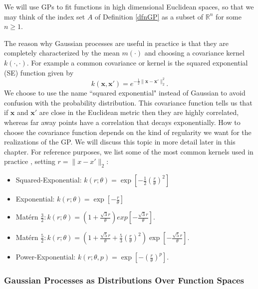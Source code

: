 \documentclass{sfuthesis}
\newcommand{\x}{\textbf{x}}
\begin{document}
 

We will use GPs to fit  functions in  high dimensional Euclidean spaces, so 
that we may think
of the  index set $A$ of Definition \ref{dfnGP} as a subset of $\mathbb{R}^{n}$ for some $n\geq 1$. 
\newline

The reason why  Gaussian processes are useful in practice is that  they are 
completely characterized by the mean $m(\cdot)$ and choosing a covariance kernel $k(\cdot,\cdot)$\cite{lifshits2012lectures}. 
 For example a  common covariance or kernel is the
 squared exponential (SE) function given by  
\begin{equation}\label{eqnsquareexponential}
k(\x,\x')=e^{-\frac{1}{2}\|\x-\x'\|_{2}^{2}}.
\end{equation}
We choose to use the name ``squared exponential" instead of 
Gaussian to avoid confusion with
the probability distribution.
This  covariance function tells us that if $\x$ and $\x'$ are close in the Euclidean metric 
then they are highly correlated, whereas far away points have a correlation that decays exponentially.
How to choose the covariance function depends on the kind
of regularity we want for the realizations of the GP. We will discuss this topic in
more detail later in this chapter. For reference purposes, we list 
some of the most common kernels used in practice \cite{rasmussen2006gaussian}, setting $r=\|x-x'\|_{2}$:

\begin{itemize}
\item Squared-Exponential: $k(r;\theta)=\exp\left[-\frac{1}{2}(\frac{r}{\theta})^{2}\right]$
\item Exponential: $k(r;\theta)=\exp\left[-\frac{r}{\theta}\right]$\\
\item Mat{\'e}rn $\frac{3}{2}: k(r;\theta)=(1+\frac{\sqrt{3}r}{\theta})exp\left[-\frac{\sqrt{3}r}{\theta}\right]$.
\item Mat{\'e}rn $\frac{5}{2}: k(r;\theta)=(1+\frac{\sqrt{5}r}{\theta}+\frac{5}{3}
(\frac{r}{\theta})^{2})\exp\left[-\frac{\sqrt{5}r}{\theta}\right]$.
\item Power-Exponential: $k(r;\theta,p)=\exp\left[-(\frac{r}{\theta})^{p}\right]$.
\end{itemize}





\subsubsection{Gaussian Processes as Distributions Over Function Spaces}
\end{document}
